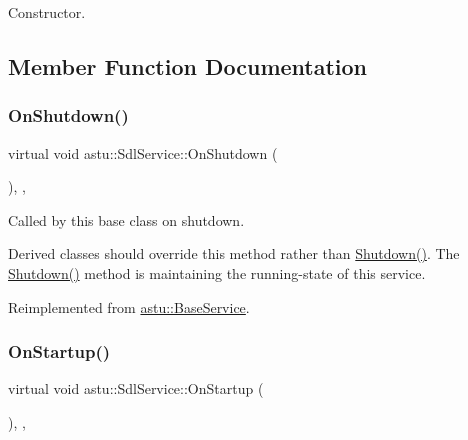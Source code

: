 Constructor. 

\subsection{Member Function Documentation}
\mbox{\label{classastu_1_1SdlService_a20d53237efd1c717d773a8ff121b093b}} 
\subsubsection{\texorpdfstring{On\+Shutdown()}{OnShutdown()}}
{\footnotesize\ttfamily virtual void astu\+::\+Sdl\+Service\+::\+On\+Shutdown (\begin{DoxyParamCaption}{ }\end{DoxyParamCaption})\hspace{0.3cm}{\ttfamily [override]}, {\ttfamily [protected]}, {\ttfamily [virtual]}}

Called by this base class on shutdown.

Derived classes should override this method rather than {\ttfamily \hyperlink{classastu_1_1BaseService_a7095888244052db294d58738c0d187fb}{Shutdown()}}. The {\ttfamily \hyperlink{classastu_1_1BaseService_a7095888244052db294d58738c0d187fb}{Shutdown()}} method is maintaining the running-\/state of this service. 

Reimplemented from \hyperlink{classastu_1_1BaseService_aeb5003f7c5efe5412725ac4c66942d03}{astu\+::\+Base\+Service}.

\mbox{\label{classastu_1_1SdlService_a2fcb46537de794ab6e4f5e043b26ff60}} 
\subsubsection{\texorpdfstring{On\+Startup()}{OnStartup()}}
{\footnotesize\ttfamily virtual void astu\+::\+Sdl\+Service\+::\+On\+Startup (\begin{DoxyParamCaption}{ }\end{DoxyParamCaption})\hspace{0.3cm}{\ttfamily [override]}, {\ttfamily [protected]}, {\ttfamily [virtual]}}

